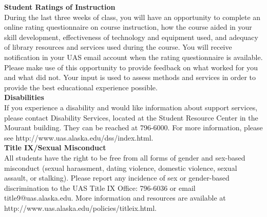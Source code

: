 \documentclass[11pt,letterpaper]{article}
\begin{document}

\textbf{Student Ratings of Instruction}\\
During the last three weeks of class, you will have an opportunity to complete an online rating questionnaire on course instruction, how the course aided in your skill development,  effectiveness of technology and equipment used, and adequacy of library resources and services used during the course. You will receive notification in your UAS email account when the rating questionnaire is available. Please make use of this opportunity to provide feedback on what worked for you and what did not. Your input is used to assess methods and services in order to provide the best educational experience possible.\\

\textbf{Disabilities}\\
If you experience a disability and would like information about support services, please contact Disability Services, located at the Student Resource Center in the Mourant building.  They can be reached at 796-6000. For more information, please see http://www.uas.alaska.edu/dss/index.html.\\

\textbf{Title IX/Sexual Misconduct}\\
All students have the right to be free from all forms of gender and sex-based misconduct (sexual harassment, dating violence, domestic violence, sexual assault, or stalking). Please report any incidence of sex or gender-based discrimination to the UAS Title IX Office: 796-6036 or email {title9@uas.alaska.edu}. More information and resources are available at\\ http://www.uas.alaska.edu/policies/titleix.html.
\end{document}
